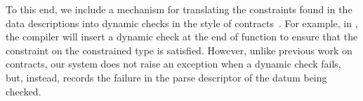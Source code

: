 To this end, we include a mechanism for translating the constraints
found in the data descriptions into dynamic checks in the style of
contracts~\cite{findler+:contracts}. For example, in
, the compiler will insert a dynamic check
at the end of function  to ensure that the constraint
on the constrained type is satisfied. However, unlike previous work on
contracts, our system does not raise an exception when a dynamic check
fails, but, instead, records the failure in the parse descriptor of
the datum being checked.  


